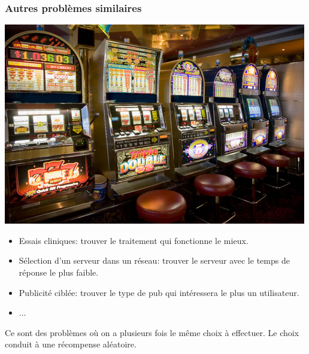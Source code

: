 \documentclass[compress, color = usenames, dvipsnames]{beamer}
\begin{document}
\begin{frame}
    \frametitle{Autres problèmes similaires}
    \begin{center}
        \includegraphics[scale=0.8]{figs/bandit_casino.jpg}
    \end{center}
    \begin{itemize}
        \item Essais cliniques: trouver le traitement qui fonctionne le mieux.
        \item Sélection d'un serveur dans un réseau: trouver le serveur avec le temps de réponse le plus faible.
        \item Publicité ciblée: trouver le type de pub qui intéressera le plus un utilisateur.
        \item ...
    \end{itemize}
    Ce sont des problèmes où on a plusieurs fois le même choix à effectuer. Le choix conduit à une récompense aléatoire.
\end{frame}
\end{document}
